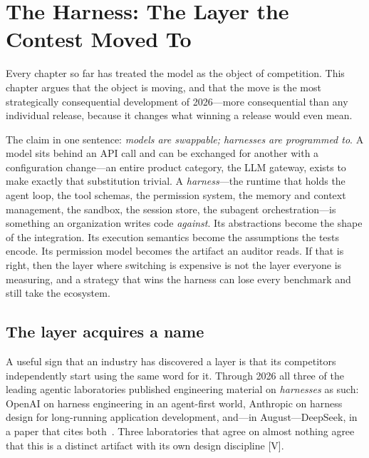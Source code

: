 \chapter{The Harness: The Layer the Contest Moved To}
\label{ch:harness}

Every chapter so far has treated the model as the object of competition. This chapter argues that the object is moving, and that the move is the most strategically consequential development of 2026---more consequential than any individual release, because it changes what winning a release would even mean.

The claim in one sentence: \emph{models are swappable; harnesses are programmed to}. A model sits behind an API call and can be exchanged for another with a configuration change---an entire product category, the LLM gateway, exists to make exactly that substitution trivial. A \emph{harness}---the runtime that holds the agent loop, the tool schemas, the permission system, the memory and context management, the sandbox, the session store, the subagent orchestration---is something an organization writes code \emph{against}. Its abstractions become the shape of the integration. Its execution semantics become the assumptions the tests encode. Its permission model becomes the artifact an auditor reads. If that is right, then the layer where switching is expensive is not the layer everyone is measuring, and a strategy that wins the harness can lose every benchmark and still take the ecosystem.

\section{The layer acquires a name}

A useful sign that an industry has discovered a layer is that its competitors independently start using the same word for it. Through 2026 all three of the leading agentic laboratories published engineering material on \emph{harnesses} as such: OpenAI on harness engineering in an agent-first world, Anthropic on harness design for long-running application development, and---in August---DeepSeek, in a paper that cites both~\cite{cordis-paper}. Three laboratories that agree on almost nothing agree that this is a distinct artifact with its own design discipline [V].

